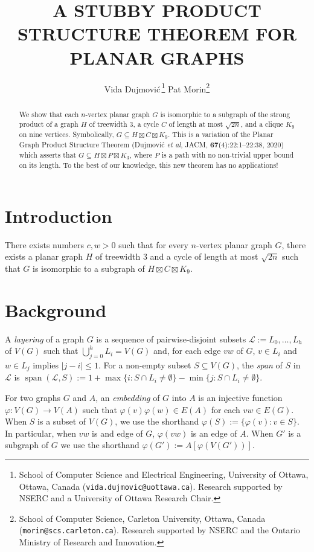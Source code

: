 \documentclass{patmorin}
\title{\MakeUppercase{\boldmath A Stubby Product Structure Theorem for Planar Graphs}}
\author{
 Vida Dujmovi{\'c}\,\footnote{School of Computer Science and Electrical Engineering, University of Ottawa, Ottawa, Canada (\texttt{vida.dujmovic@uottawa.ca}). Research supported by NSERC and a University of Ottawa Research Chair.}
 \qquad
 Pat Morin\footnote{School of Computer Science, Carleton University, Ottawa, Canada (\texttt{morin@scs.carleton.ca}). Research supported by NSERC and the Ontario Ministry of Research and Innovation.}
 }
\date{}
\newcommand{\defin}[1]{\emph{\textcolor{brightmaroon}{#1}}}
\DeclareMathOperator{\spn}{span}
\begin{document}
\maketitle

\begin{abstract}
  We show that each $n$-vertex planar graph $G$ is isomorphic to a subgraph of the strong product of a graph $H$ of treewidth $3$, a cycle $C$ of length at most $\sqrt{2n}$, and a clique $K_9$ on nine vertices.  Symbolically, $G\subseteq H\boxtimes C\boxtimes K_9$. This is a variation of the Planar Graph Product Structure Theorem (Dujmović \emph{et al}, JACM, \textbf{67}(4):22:1–22:38, 2020) which asserts that $G\subseteq H\boxtimes P\boxtimes K_3$, where $P$ is a path with no non-trivial upper bound on its length.  To the best of our knowledge, this new theorem has no applications!
\end{abstract}

\section{Introduction}




\begin{thm}\label{main_thm}
  There exists numbers $c,w>0$ such that for every $n$-vertex planar graph $G$, there exists a planar graph $H$ of treewidth $3$ and a cycle of length at most $\sqrt{2n}$ such that $G$ is isomorphic to a subgraph of $H\boxtimes C\boxtimes K_9$.
\end{thm}




\section{Background}

A \defin{layering} of a graph $G$ is a sequence of pairwise-disjoint subsets $\mathcal{L}:=L_0,\ldots,L_h$ of $V(G)$ such that $\bigcup_{j=0}^h L_i=V(G)$ and, for each edge $vw$ of $G$, $v\in L_i$ and $w\in L_j$ implies $|j-i|\le 1$.  For a non-empty subset $S\subseteq V(G)$, the \defin{span} of $S$ in $\mathcal{L}$ is $\spn(\mathcal{L},S):=1+\max\{i:S\cap L_i\neq\emptyset\}-\min\{j:S\cap L_i\neq\emptyset\}$.


For two graphs $G$ and $A$, an \defin{embedding} of $G$ into $A$ is an injective function $\varphi:V(G)\to V(A)$ such that $\varphi(v)\varphi(w)\in E(A)$ for each $vw\in E(G)$.  When $S$ is a subset of $V(G)$, we use the shorthand $\varphi(S):=\{\varphi(v):v\in S\}$.  In particular, when $vw$ is and edge of $G$, $\varphi(vw)$ is an edge of $A$.  When $G'$ is a subgraph of $G$ we use the shorthand $\varphi(G'):=A[\varphi(V(G'))]$.
\end{document}
